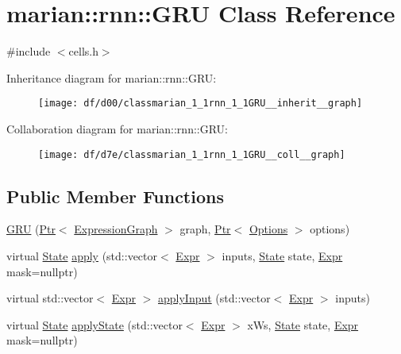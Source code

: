 \hypertarget{classmarian_1_1rnn_1_1GRU}{}\section{marian\+:\+:rnn\+:\+:G\+RU Class Reference}
\label{classmarian_1_1rnn_1_1GRU}


{\ttfamily \#include $<$cells.\+h$>$}



Inheritance diagram for marian\+:\+:rnn\+:\+:G\+RU\+:
\nopagebreak
\begin{figure}[H]
\begin{center}
\leavevmode
\texttt{[image: df/d00/classmarian\_1\_1rnn\_1\_1GRU\_\_inherit\_\_graph]}
\end{center}
\end{figure}


Collaboration diagram for marian\+:\+:rnn\+:\+:G\+RU\+:
\nopagebreak
\begin{figure}[H]
\begin{center}
\leavevmode
\texttt{[image: df/d7e/classmarian\_1\_1rnn\_1\_1GRU\_\_coll\_\_graph]}
\end{center}
\end{figure}
\subsection*{Public Member Functions}
\begin{DoxyCompactItemize}
\item 
\hyperlink{classmarian_1_1rnn_1_1GRU_a3f47434b08986222608a2a31f776c334}{G\+RU} (\hyperlink{namespacemarian_ad1a373be43a00ef9ce35666145137b08}{Ptr}$<$ \hyperlink{classmarian_1_1ExpressionGraph}{Expression\+Graph} $>$ graph, \hyperlink{namespacemarian_ad1a373be43a00ef9ce35666145137b08}{Ptr}$<$ \hyperlink{classmarian_1_1Options}{Options} $>$ options)
\item 
virtual \hyperlink{structmarian_1_1rnn_1_1State}{State} \hyperlink{classmarian_1_1rnn_1_1GRU_af8c554f9e899a74dfd897de082ef893e}{apply} (std\+::vector$<$ \hyperlink{namespacemarian_a498d8baf75b754011078b890b39c8e12}{Expr} $>$ inputs, \hyperlink{structmarian_1_1rnn_1_1State}{State} state, \hyperlink{namespacemarian_a498d8baf75b754011078b890b39c8e12}{Expr} mask=nullptr)
\item 
virtual std\+::vector$<$ \hyperlink{namespacemarian_a498d8baf75b754011078b890b39c8e12}{Expr} $>$ \hyperlink{classmarian_1_1rnn_1_1GRU_a1e68f7a3e40ee5fefa954096e3eb2bdc}{apply\+Input} (std\+::vector$<$ \hyperlink{namespacemarian_a498d8baf75b754011078b890b39c8e12}{Expr} $>$ inputs)
\item 
virtual \hyperlink{structmarian_1_1rnn_1_1State}{State} \hyperlink{classmarian_1_1rnn_1_1GRU_a80e15118ba400b0e393a4b2eb9fcf23d}{apply\+State} (std\+::vector$<$ \hyperlink{namespacemarian_a498d8baf75b754011078b890b39c8e12}{Expr} $>$ x\+Ws, \hyperlink{structmarian_1_1rnn_1_1State}{State} state, \hyperlink{namespacemarian_a498d8baf75b754011078b890b39c8e12}{Expr} mask=nullptr)
\end{DoxyCompactItemize}
